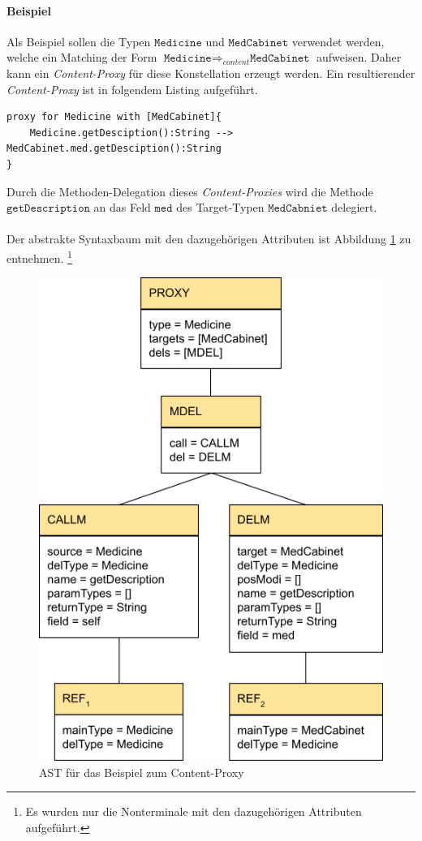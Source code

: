 \documentclass[a4paper,12pt]{article}
\begin{document}
\paragraph{Beispiel} Als Beispiel sollen die Typen $\texttt{Medicine}$ und $\texttt{MedCabinet}$ verwendet werden, welche ein Matching der Form $\texttt{Medicine} \Rightarrow_{content} \texttt{MedCabinet}$ aufweisen. Daher kann ein \emph{Content-Proxy} für diese Konstellation erzeugt werden. Ein resultierender \emph{Content-Proxy} ist in folgendem Listing aufgeführt.
\begin{lstlisting}[style = dsl, caption = Content-Proxy für Medicine, captionpos = b]
proxy for Medicine with [MedCabinet]{
	Medicine.getDesciption():String --> MedCabinet.med.getDesciption():String
}
\end{lstlisting}
Durch die Methoden-Delegation dieses \emph{Content-Proxies} wird die Methode $\texttt{getDescription}$ an das Feld $\texttt{med}$ des Target-Typen $\texttt{MedCabniet}$ delegiert.\\\\
Der abstrakte Syntaxbaum mit den dazugehörigen Attributen ist Abbildung \ref{fig:ASTCONTENT} zu entnehmen. \footnote{Es wurden nur die Nonterminale mit den dazugehörigen Attributen aufgeführt.}
\begin{figure}[h!]
\centering
\includegraphics[width=0.5\linewidth]{AST_ContentExample}
\caption{AST für das Beispiel zum Content-Proxy}
\label{fig:ASTCONTENT}
\end{figure}
\noindent
\end{document}
